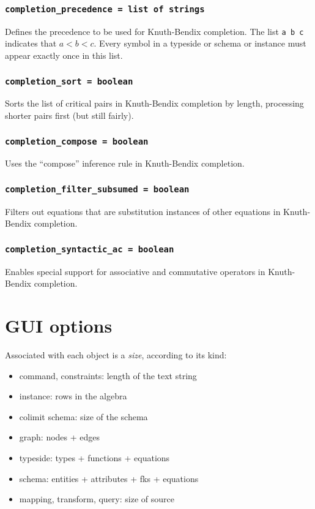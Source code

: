 \documentclass[10pt]{book}
\begin{document}
\subsubsection{{\tt completion\_precedence = list of strings}}

Defines the precedence to be used for Knuth-Bendix completion.  The list {\tt a b c} indicates that $a < b < c$.  Every symbol in a typeside or schema or instance must appear exactly once in this list.

\subsubsection{{\tt completion\_sort = boolean}}

Sorts the list of critical pairs in Knuth-Bendix completion by length, processing shorter pairs first (but still fairly).

\subsubsection{{\tt completion\_compose = boolean}}

Uses the ``compose'' inference rule in Knuth-Bendix completion.

\subsubsection{{\tt completion\_filter\_subsumed = boolean}}

Filters out equations that are substitution instances of other equations in Knuth-Bendix completion.

\subsubsection{{\tt completion\_syntactic\_ac = boolean}}

Enables special support for associative and commutative operators in Knuth-Bendix completion.

\section{GUI options}

Associated with each object is a {\it size}, according to its kind:
\begin{itemize}
\item command, constraints: length of the text string
\item instance: rows in the algebra
\item colimit schema: size of the schema
\item graph: nodes + edges
\item typeside: types + functions + equations
\item schema: entities + attributes + fks + equations
\item mapping, transform, query: size of source
\end{itemize}
\end{document}
